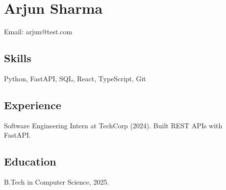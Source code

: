 \documentclass{article}
\begin{document}
\section*{Arjun Sharma}
Email: arjun@test.com
\subsection*{Skills}
Python, FastAPI, SQL, React, TypeScript, Git
\subsection*{Experience}
Software Engineering Intern at TechCorp (2024). Built REST APIs with FastAPI.
\subsection*{Education}
B.Tech in Computer Science, 2025.
\end{document}
